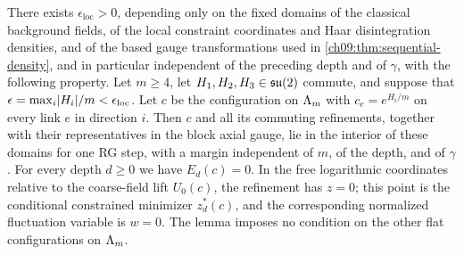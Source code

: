 \begin{lemma}\label{ch27:lem:local-flat-admission}
There exists $\epsilon_{\mathrm{loc}}>0$, depending only on the fixed domains of the classical background fields, of the local constraint coordinates and Haar disintegration densities, and of the based gauge transformations used in \cref{ch09:thm:sequential-density}, and in particular independent of the preceding depth and of $\gamma$, with the following property. Let $m\ge4$, let $H_1,H_2,H_3\in\mathfrak{su}(2)$ commute, and suppose that $\epsilon=\max_i\lvert H_i\rvert/m<\epsilon_{\mathrm{loc}}$. Let $c$ be the configuration on $\Lambda_{m}$ with $c_e=e^{H_i/m}$ on every link $e$ in direction $i$. Then $c$ and all its commuting refinements, together with their representatives in the block axial gauge, lie in the interior of these domains for one RG step, with a margin independent of $m$, of the depth, and of $\gamma$. For every depth $d\ge0$ we have $E_d(c)=0$. In the free logarithmic coordinates relative to the coarse-field lift $U_0(c)$, the refinement has $z=0$; this point is the conditional constrained minimizer $z_d^*(c)$, and the corresponding normalized fluctuation variable is $w=0$. The lemma imposes no condition on the other flat configurations on $\Lambda_{m}$.
\end{lemma}

